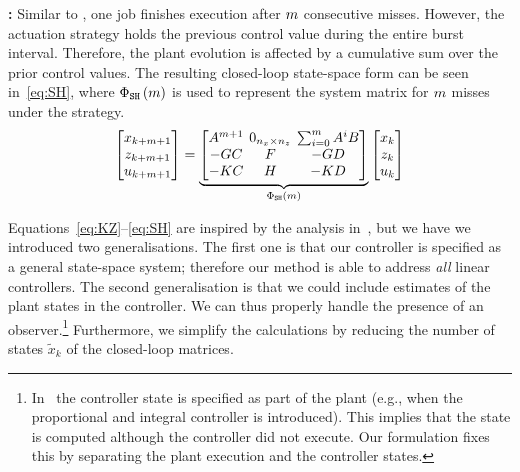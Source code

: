 \textbf{\tSH{}: }%
%
Similar to \tSZ{}, one job finishes execution after $m$ consecutive misses.
However, the actuation strategy holds the previous control value during the entire burst interval.
Therefore, the plant evolution is affected by a cumulative sum over the prior control values.
The resulting closed-loop state-space form can be seen in~\eqref{eq:SH}, where $\Phi{}_{\texttt{S}\texttt{H}}\left( m \right)$ is used to represent the system matrix for $m$ misses under the \tSH{} strategy.
%
\begin{equation}
\setlength\arraycolsep{2pt}
\label{eq:SH}
    \begin{bmatrix}
        x_{k+\nummisses+1} \\
        z_{k+\nummisses+1} \\
        u_{k+\nummisses+1}
    \end{bmatrix} = 
    \underbrace{\begin{bmatrix}
        \Ap^{\nummisses+1}  & 0_{n_x \times n_z}  & \sum_{i=0}^\nummisses \Ap^i\Bp \\
        -\Bc\Cp             & \Ac                                       & -\Bc\Dp \\
        -\Dc\Cp             & \Cc                                       & -\Dc\Dp
    \end{bmatrix}}_{\clmat{}_{\Skip\Hold}\funof{\nummisses}}
    \begin{bmatrix}
        x_{k} \\
        z_{k} \\
        u_{k}
    \end{bmatrix}
\end{equation}

Equations~\eqref{eq:KZ}--\eqref{eq:SH} are inspired by the analysis in~\cite{Maggio:2020}, but we have we introduced two generalisations.
The first one is that our controller is specified as a general state-space system; therefore our method is able to address \emph{all} linear controllers.
The second generalisation is that we could include estimates of the plant states in the controller.
We can thus properly handle the presence of an observer.\footnote{In~\cite{Maggio:2020} the controller state is specified as part of the plant (e.g., when the proportional and integral controller is introduced). This implies that the state is computed although the controller did not execute. Our formulation fixes this by separating the plant execution and the controller states.}
Furthermore, we simplify the calculations by reducing the number of states $\tilde{x}_k$ of the closed-loop matrices.

